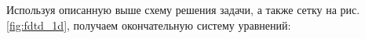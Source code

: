 \documentclass[a4paper]{article}
\begin{document}
Используя описанную выше схему решения задачи, а также сетку на рис. \ref{fig:fdtd_1d}, получаем окончательную систему уравнений:
\newpage
%
\end{document}
